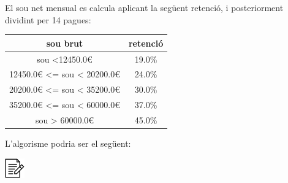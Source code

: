 \documentclass[
]{book}
\begin{document}
El sou net mensual es calcula aplicant la següent retenció, i posteriorment dividint per 14 pagues:

\begin{longtable}[]{@{}cc@{}}
\toprule
sou brut & retenció\tabularnewline
\midrule
\endhead
sou \textless12450.0€ & 19.0\%\tabularnewline
12450.0€ \textless= sou \textless{} 20200.0€ & 24.0\%\tabularnewline
20200.0€ \textless= sou \textless{} 35200.0€ & 30.0\%\tabularnewline
35200.0€ \textless= sou \textless{} 60000.0€ & 37.0\%\tabularnewline
sou \textgreater{} 60000.0€ & 45.0\%\tabularnewline
\bottomrule
\end{longtable}

L'algorisme podria ser el següent:

\includegraphics{./img/alg.png}
\end{document}
